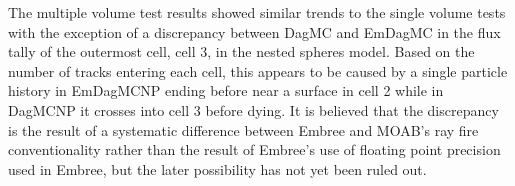 \documentclass{anstrans}
\begin{document}
     



The multiple volume test results showed similar trends to the single volume tests with the exception of a discrepancy between DagMC and EmDagMC in the flux tally of the outermost cell, cell 3, in the nested spheres model. Based on the number of tracks entering each cell, this appears to be caused by a single particle history in EmDagMCNP ending before near a surface in cell 2 while in DagMCNP it crosses into cell 3 before dying. It is believed that the discrepancy is the result of a systematic difference between Embree and MOAB's ray fire conventionality rather than the result of Embree's use of floating point precision used in Embree, but the later possibility has not yet been ruled out.
\end{document}
